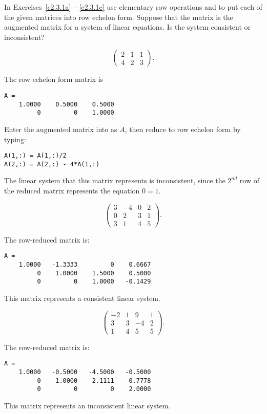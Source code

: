 \documentclass{ximera}
\begin{document}
\noindent In Exercises~\ref{c2.3.1a} -- \ref{c2.3.1c} use elementary row
operations and \Matlab to put each of the given matrices into row echelon
form.  Suppose that the matrix is the augmented matrix for a system of
linear equations.  Is the system consistent or inconsistent?

\begin{computerExercise} \label{c2.3.1a}
\[
\left(\begin{array}{rrr}
 2 &  1  &  1   \\
 4 &  2  &  3
\end{array}\right).
\]

\begin{solution}
\ans The row echelon form matrix is
\begin{verbatim}
A = 
    1.0000    0.5000    0.5000
         0         0    1.0000
\end{verbatim}
\soln Enter the augmented matrix into \Matlab as $A$, then reduce to
row echelon form by typing:
\begin{verbatim}
A(1,:) = A(1,:)/2
A(2,:) = A(2,:) - 4*A(1,:)
\end{verbatim}
The linear system that this matrix represents is inconsistent, since
the $2^{nd}$ row of the reduced matrix represents the equation $0 = 1$.

\end{solution}
\end{computerExercise}
\begin{computerExercise} \label{c2.3.1b}
\[
\left(\begin{array}{rrrr}
 3  & -4 & 0 & 2\\
 0  &  2 & 3 & 1\\
 3  &  1 & 4 & 5
\end{array}\right).
\]

\begin{solution}
The row-reduced matrix is:
\begin{verbatim}
A =
    1.0000   -1.3333         0    0.6667
         0    1.0000    1.5000    0.5000
         0         0    1.0000   -0.1429
\end{verbatim}
This matrix represents a consistent linear system.

\end{solution}
\end{computerExercise}
\begin{computerExercise} \label{c2.3.1c}
\[
\left(\begin{array}{rrrr}
 -2 & 1 &  9 & 1\\
  3 & 3 & -4 & 2\\
  1 & 4 &  5 & 5
\end{array}\right).
\]

\begin{solution}
The row-reduced matrix is:
\begin{verbatim}
A =
    1.0000   -0.5000   -4.5000   -0.5000
         0    1.0000    2.1111    0.7778
         0         0         0    2.0000
\end{verbatim}
This matrix represents an inconsistent linear system.


\end{solution}
\end{computerExercise}
\end{document}

